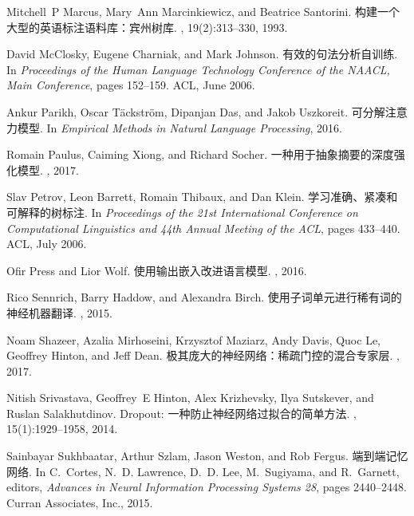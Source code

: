 \documentclass{article}
\begin{document}
\begin{thebibliography}{10}
Mitchell~P Marcus, Mary~Ann Marcinkiewicz, and Beatrice Santorini.
\newblock 构建一个大型的英语标注语料库：宾州树库.
, 19(2):313--330, 1993.

David McClosky, Eugene Charniak, and Mark Johnson.
\newblock 有效的句法分析自训练.
\newblock In {\em Proceedings of the Human Language Technology Conference of
  the NAACL, Main Conference}, pages 152--159. ACL, June 2006.

Ankur Parikh, Oscar Täckström, Dipanjan Das, and Jakob Uszkoreit.
\newblock 可分解注意力模型.
\newblock In {\em Empirical Methods in Natural Language Processing}, 2016.

Romain Paulus, Caiming Xiong, and Richard Socher.
\newblock 一种用于抽象摘要的深度强化模型.
, 2017.

Slav Petrov, Leon Barrett, Romain Thibaux, and Dan Klein.
\newblock 学习准确、紧凑和可解释的树标注.
\newblock In {\em Proceedings of the 21st International Conference on
  Computational Linguistics and 44th Annual Meeting of the ACL}, pages
  433--440. ACL, July 2006.

Ofir Press and Lior Wolf.
\newblock 使用输出嵌入改进语言模型.
, 2016.

Rico Sennrich, Barry Haddow, and Alexandra Birch.
\newblock 使用子词单元进行稀有词的神经机器翻译.
, 2015.

Noam Shazeer, Azalia Mirhoseini, Krzysztof Maziarz, Andy Davis, Quoc Le,
  Geoffrey Hinton, and Jeff Dean.
\newblock 极其庞大的神经网络：稀疏门控的混合专家层.
, 2017.

Nitish Srivastava, Geoffrey~E Hinton, Alex Krizhevsky, Ilya Sutskever, and
  Ruslan Salakhutdinov.
\newblock Dropout: 一种防止神经网络过拟合的简单方法.
, 15(1):1929--1958, 2014.

Sainbayar Sukhbaatar, Arthur Szlam, Jason Weston, and Rob Fergus.
\newblock 端到端记忆网络.
\newblock In C.~Cortes, N.~D. Lawrence, D.~D. Lee, M.~Sugiyama, and R.~Garnett,
  editors, {\em Advances in Neural Information Processing Systems 28}, pages
  2440--2448. Curran Associates, Inc., 2015.


\end{thebibliography}
\end{document}
